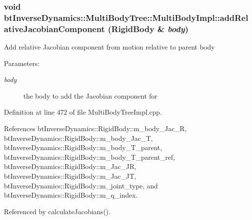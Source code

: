 \hypertarget{classbt_inverse_dynamics_1_1_multi_body_tree_1_1_multi_body_impl_6facecec947e6b43378ba20e6b98eea7}{
\subsubsection[addRelativeJacobianComponent]{\setlength{\rightskip}{0pt plus 5cm}void btInverseDynamics::MultiBodyTree::MultiBodyImpl::addRelativeJacobianComponent ({\bf RigidBody} \& {\em body})}}
\label{classbt_inverse_dynamics_1_1_multi_body_tree_1_1_multi_body_impl_6facecec947e6b43378ba20e6b98eea7}


Add relative Jacobian component from motion relative to parent body \begin{Desc}
\item[Parameters:]
\begin{description}
\item[{\em body}]the body to add the Jacobian component for \end{description}
\end{Desc}


Definition at line 472 of file MultiBodyTreeImpl.cpp.

References btInverseDynamics::RigidBody::m\_\-body\_\-Jac\_\-R, btInverseDynamics::RigidBody::m\_\-body\_\-Jac\_\-T, btInverseDynamics::RigidBody::m\_\-body\_\-T\_\-parent, btInverseDynamics::RigidBody::m\_\-body\_\-T\_\-parent\_\-ref, btInverseDynamics::RigidBody::m\_\-Jac\_\-JR, btInverseDynamics::RigidBody::m\_\-Jac\_\-JT, btInverseDynamics::RigidBody::m\_\-joint\_\-type, and btInverseDynamics::RigidBody::m\_\-q\_\-index.

Referenced by calculateJacobians().

